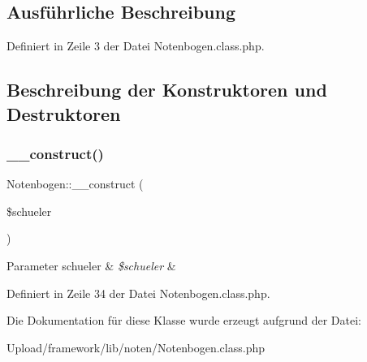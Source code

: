\subsection{Ausführliche Beschreibung}


Definiert in Zeile 3 der Datei Notenbogen.\+class.\+php.



\subsection{Beschreibung der Konstruktoren und Destruktoren}
\mbox{\label{class_notenbogen_a937ed1b8ebe4d26007088dc4cdefd839}} 
\subsubsection{\texorpdfstring{\+\_\+\+\_\+construct()}{\_\_construct()}}
{\footnotesize\ttfamily Notenbogen\+::\+\_\+\+\_\+construct (\begin{DoxyParamCaption}\item[{}]{\$schueler }\end{DoxyParamCaption})}


\begin{DoxyParams}[1]{Parameter}
schueler & {\em \$schueler} & \\
\hline
\end{DoxyParams}


Definiert in Zeile 34 der Datei Notenbogen.\+class.\+php.



Die Dokumentation für diese Klasse wurde erzeugt aufgrund der Datei\+:\begin{DoxyCompactItemize}
\item 
Upload/framework/lib/noten/Notenbogen.\+class.\+php\end{DoxyCompactItemize}
